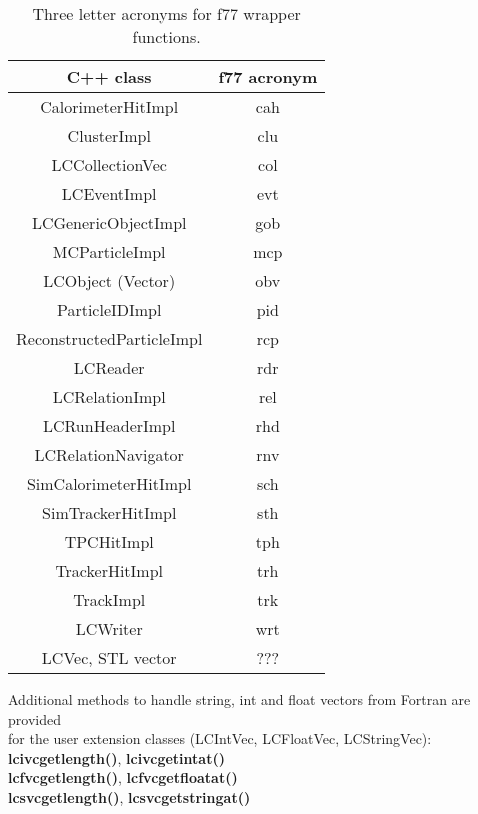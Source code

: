 \begin{table}
\begin{center}
\begin{tabular}{|c|c|}
\hline
\rule[-5mm]{0mm}{10mm} C++ class  &  f77 acronym   \\ \hline \hline

 CalorimeterHitImpl         & cah \\ \hline
 ClusterImpl                & clu \\ \hline
 LCCollectionVec            & col \\ \hline
 LCEventImpl                & evt \\ \hline
 LCGenericObjectImpl        & gob \\ \hline
 MCParticleImpl             & mcp \\ \hline
 LCObject (Vector)          & obv \\ \hline
 ParticleIDImpl             & pid \\ \hline
 ReconstructedParticleImpl  & rcp \\ \hline
 LCReader                   & rdr \\ \hline
 LCRelationImpl             & rel \\ \hline
 LCRunHeaderImpl            & rhd \\ \hline
 LCRelationNavigator        & rnv \\ \hline
 SimCalorimeterHitImpl      & sch \\ \hline
 SimTrackerHitImpl          & sth \\ \hline
 TPCHitImpl                 & tph \\ \hline
 TrackerHitImpl             & trh \\ \hline
 TrackImpl                  & trk \\ \hline
 LCWriter                   & wrt \\ \hline \hline

 LCVec, STL vector          & ??? \\ \hline

\end{tabular}
\end{center}
\caption{Three letter acronyms for f77 wrapper functions.}
\label{tab_f77}
\end{table}

Additional methods to handle string, int and float vectors from Fortran are provided\\
for the user extension classes (LCIntVec, LCFloatVec, LCStringVec):\\
{\bf lcivcgetlength()}, {\bf lcivcgetintat()}  \\
{\bf lcfvcgetlength()}, {\bf lcfvcgetfloatat()} \\
{\bf lcsvcgetlength()}, {\bf lcsvcgetstringat()}  \\

